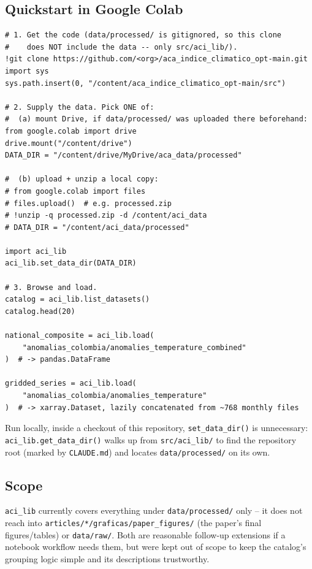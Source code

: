 \documentclass[11pt]{article}
\begin{document}
\subsection{Quickstart in Google Colab}

\begin{lstlisting}
# 1. Get the code (data/processed/ is gitignored, so this clone
#    does NOT include the data -- only src/aci_lib/).
!git clone https://github.com/<org>/aca_indice_climatico_opt-main.git
import sys
sys.path.insert(0, "/content/aca_indice_climatico_opt-main/src")

# 2. Supply the data. Pick ONE of:
#  (a) mount Drive, if data/processed/ was uploaded there beforehand:
from google.colab import drive
drive.mount("/content/drive")
DATA_DIR = "/content/drive/MyDrive/aca_data/processed"

#  (b) upload + unzip a local copy:
# from google.colab import files
# files.upload()  # e.g. processed.zip
# !unzip -q processed.zip -d /content/aci_data
# DATA_DIR = "/content/aci_data/processed"

import aci_lib
aci_lib.set_data_dir(DATA_DIR)

# 3. Browse and load.
catalog = aci_lib.list_datasets()
catalog.head(20)

national_composite = aci_lib.load(
    "anomalias_colombia/anomalies_temperature_combined"
)  # -> pandas.DataFrame

gridded_series = aci_lib.load(
    "anomalias_colombia/anomalies_temperature"
)  # -> xarray.Dataset, lazily concatenated from ~768 monthly files
\end{lstlisting}

Run locally, inside a checkout of this repository, \texttt{set\_data\_dir()}
is unnecessary: \texttt{aci\_lib.get\_data\_dir()} walks up from
\texttt{src/aci\_lib/} to find the repository root (marked by
\texttt{CLAUDE.md}) and locates \texttt{data/processed/} on its own.

\subsection{Scope}

\texttt{aci\_lib} currently covers everything under \texttt{data/processed/}
only -- it does not reach into \texttt{articles/*/graficas/\allowbreak paper\_figures/}
(the paper's final figures/tables) or \texttt{data/raw/}. Both are
reasonable follow-up extensions if a notebook workflow needs them, but were
kept out of scope to keep the catalog's grouping logic simple and its
descriptions trustworthy.
\end{document}
